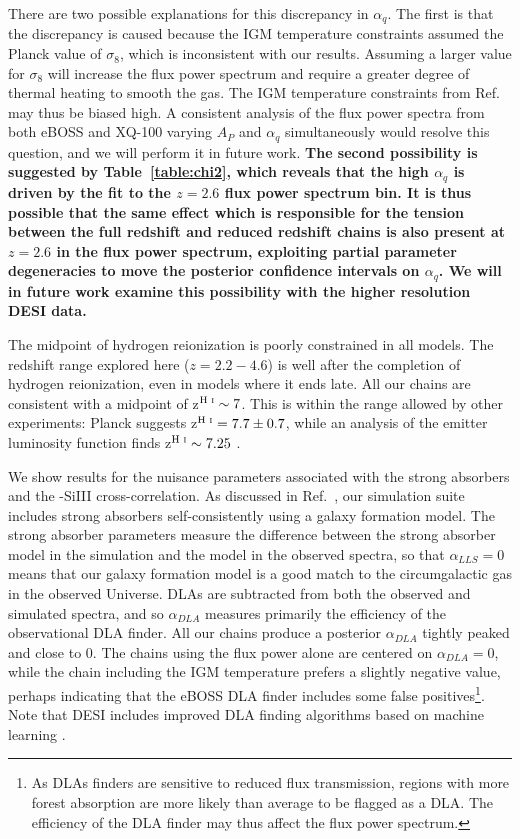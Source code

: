 There are two possible explanations for this discrepancy in $\alpha_q$. The first is that the discrepancy is caused because the IGM temperature constraints assumed the Planck value of $\sigma_8$, which is inconsistent with our results. Assuming a larger value for $\sigma_8$ will increase the flux power spectrum and require a greater degree of thermal heating to smooth the gas. The IGM temperature constraints from Ref.~\cite{2021MNRAS.506.4389G} may thus be biased high. A consistent analysis of the flux power spectra from both eBOSS and XQ-100 varying $A_P$ and $\alpha_q$ simultaneously would resolve this question, and we will perform it in future work. \textbf{The second possibility is suggested by Table~\ref{table:chi2}, which reveals that the high $\alpha_q$ is driven by the fit to the $z=2.6$ flux power spectrum bin. It is thus possible that the same effect which is responsible for the tension between the full redshift and reduced redshift chains is also present at $z=2.6$ in the flux power spectrum, exploiting partial parameter degeneracies to move the posterior confidence intervals on $\alpha_q$. We will in future work examine this possibility with the higher resolution DESI data.}

The midpoint of hydrogen reionization is poorly constrained in all models.
The redshift range explored here ($z=2.2-4.6$) is well after the completion of hydrogen reionization, even in models where it ends late. All our chains are consistent with a midpoint of z$^{\text{H~{\sc i}}} \sim 7$.
This is within the range allowed by other experiments: Planck suggests z$^{\text{H~{\sc i}}} = 7.7 \pm 0.7$, while an analysis of the \Lya emitter luminosity function finds z$^{\text{H~{\sc i}}} \sim 7.25$ \cite{2021ApJ...919..120M}.

We show results for the nuisance parameters associated with the strong absorbers and the \Lya-SiIII cross-correlation.
As discussed in Ref.~\cite{2023simsuite}, our simulation suite includes strong absorbers self-consistently using a galaxy formation model.
The strong absorber parameters measure the difference between the strong absorber model in the simulation and the model in the observed spectra, so that $\alpha_{LLS} = 0$ means that our galaxy formation model is a good match to the circumgalactic gas in the observed Universe.
DLAs are subtracted from both the observed and simulated spectra, and so $\alpha_{DLA}$ measures primarily the efficiency of the observational DLA finder. 
All our chains produce a posterior $\alpha_{DLA}$ tightly peaked and close to $0$.
The chains using the flux power alone are centered on $\alpha_{DLA} = 0$, while the chain including the IGM temperature prefers a slightly negative value, perhaps indicating that the eBOSS DLA finder includes some false positives\footnote{As DLAs finders are sensitive to reduced flux transmission, regions with more \Lya forest absorption are more likely than average to be flagged as a DLA. The efficiency of the DLA finder may thus affect the flux power spectrum.}.
Note that DESI includes improved DLA finding algorithms based on machine learning \cite{Ho:2020,Parks:2018, 2022arXiv220100827W}.

